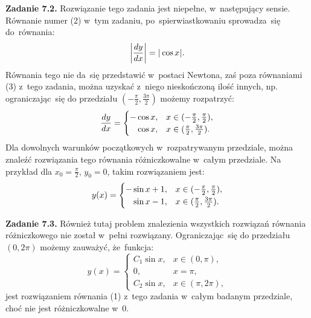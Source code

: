 \documentclass[a4paper,11pt]{article}
\numberwithin{equation}{section}
\begin{document}


\noindent
{} \textbf{Zadanie 7.2.} Rozwiązanie tego zadania jest
niepełne, w~następujący sensie. Równanie numer (2) w~tym zadaniu,
po~spierwiastkowaniu sprowadza~się do~równania:
\begin{equation}
  \label{eq:KrysickiWlodarskiAnalizaVolII-01}
  \left| \frac{ dy }{ dx } \right| = | \hspace{0.05em}  \cos x  \hspace{0.05em} |.
\end{equation}
Równania tego nie da~się przedstawić w~postaci Newtona, zaś poza
równaniami (3) z~tego zadania, można uzyskać z~niego nieskończoną
ilość innych, np. ograniczając~się do przedziału
$( -\frac{ \pi }{ 2 }, \frac{ 3 \pi }{ 2 } )$ możemy rozpatrzyć:
\begin{equation}
  \label{eq:KrysickiWlodarskiAnalizaVolII-02}
  \frac{ dy }{ dx } =
  \begin{cases}
    -\cos x, & x \in ( -\frac{ \pi }{ 2 }, \frac{ \pi }{ 2 } ), \\
    \hphantom{-}\cos x,
             & x \in ( \frac{ \pi }{ 2 }, \frac{ 3 \pi }{ 2 } ).
  \end{cases}
\end{equation}
Dla dowolnych warunków początkowych w~rozpatrywanym przedziale, można
znaleźć rozwiązania tego równania różniczkowalne w~całym przedziale.
Na przykład dla $x_{ 0 } = \frac{ \pi }{ 2 }$, $y_{ 0 } = 0$, takim
rozwiązaniem jest:
\begin{equation}
  \label{eq:KrysickiWlodarskiAnalizaVolII-03}
  y( x ) =
  \begin{cases}
    -\sin x + 1, & x \in ( -\frac{ \pi }{ 2 }, \frac{ \pi }{ 2 } ), \\
    \hphantom{-}\sin x - 1,
                 & x \in ( \frac{ \pi }{ 2 }, \frac{ 3 \pi }{ 2 } ).
  \end{cases}
\end{equation}

\VerSpaceFour





\noindent
{} \textbf{Zadanie 7.3.} Również tutaj problem znalezienia
wszystkich rozwiązań równania różniczkowego nie został w~pełni
rozwiązany. Ograniczając~się do przedziału $( 0, 2 \pi )$ możemy
zauważyć, że~funkcja:
\begin{equation}
  \label{eq:KrysickiWlodarskiAnalizaVolII-04}
  y( x ) =
  \begin{cases}
    C_{ 1 } \sin x,& x \in ( 0, \pi ), \\
    0, & x = \pi, \\
    C_{ 2 } \sin x,& x \in ( \pi, 2 \pi ),
  \end{cases}
\end{equation}
jest rozwiązaniem równania (1) z~tego zadania w~całym badanym
przedziale, choć nie jest różniczkowalne w~0.
\end{document}
